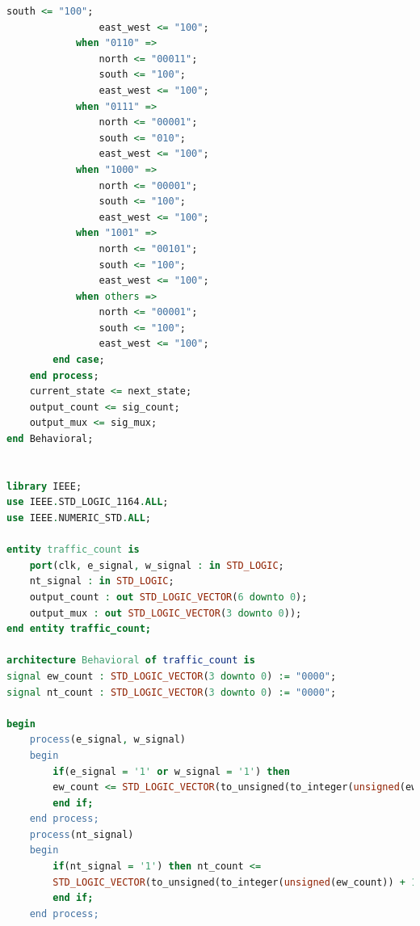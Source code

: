 \documentclass[11pt]{article}
\begin{document}
\begin{appendices}
\begin{lstlisting}[language=VHDL]
                south <= "100";
                east_west <= "100";
            when "0110" =>
                north <= "00011";
                south <= "100";
                east_west <= "100";
            when "0111" =>
                north <= "00001";
                south <= "010";
                east_west <= "100";
            when "1000" =>
                north <= "00001";
                south <= "100";
                east_west <= "100";
            when "1001" =>
                north <= "00101";
                south <= "100";
                east_west <= "100";
            when others =>
                north <= "00001";
                south <= "100";
                east_west <= "100";
        end case;
    end process;
    current_state <= next_state;
    output_count <= sig_count;
    output_mux <= sig_mux;
end Behavioral;


library IEEE;
use IEEE.STD_LOGIC_1164.ALL;
use IEEE.NUMERIC_STD.ALL;

entity traffic_count is
    port(clk, e_signal, w_signal : in STD_LOGIC;
    nt_signal : in STD_LOGIC;
    output_count : out STD_LOGIC_VECTOR(6 downto 0);
    output_mux : out STD_LOGIC_VECTOR(3 downto 0));
end entity traffic_count;

architecture Behavioral of traffic_count is
signal ew_count : STD_LOGIC_VECTOR(3 downto 0) := "0000";
signal nt_count : STD_LOGIC_VECTOR(3 downto 0) := "0000";

begin
    process(e_signal, w_signal)
    begin
        if(e_signal = '1' or w_signal = '1') then 
        ew_count <= STD_LOGIC_VECTOR(to_unsigned(to_integer(unsigned(ew_count)) + 1, 4));
        end if;
    end process;
    process(nt_signal)
    begin
        if(nt_signal = '1') then nt_count <= 
        STD_LOGIC_VECTOR(to_unsigned(to_integer(unsigned(ew_count)) + 1, 4));
        end if;
    end process;
    

\end{lstlisting}
\end{appendices}
\end{document}
